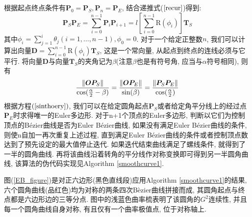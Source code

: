 \documentclass[utf8]{ctexart} %
\numberwithin{figure}{section}
\numberwithin{equation}{section}
\begin{document}
		根据起点终点条件有$\boldsymbol{P}_0=\boldsymbol{P}_S, \boldsymbol{P}_n = \boldsymbol{P}_E$, 结合递推式($\ref{recur}$)得到:
		\begin{equation}
			\boldsymbol{P}_S\boldsymbol{P}_E = \sum_{i=0}^{n-1}\boldsymbol{P}_i\boldsymbol{P}_{i+1} = l[\sum_{i=0}^{n-1}\text{R}(\phi_i)]\boldsymbol{T}_S
		\end{equation}
		其中$\phi_i=\sum_{j=1}^i\theta_j (i = 1,\dots,n-1), \phi_0 = 0$. 对于一个给定正整数$n$, 我们可以计算出向量$\boldsymbol{D} = \sum_{i=0}^{n-1}\text{R}(\phi_i)\boldsymbol{T}_S$, 这是一个常向量, 从起点到终点的连线必须与它平行. 将向量$\boldsymbol{D}$与向量$\boldsymbol{T}_S$的夹角记为$\beta$(注意$\beta$也是有符号角, 应当与$\alpha$符号相同), 则有
		\begin{equation}\label{sinthoery}
			\frac{\Arrowvert\boldsymbol{OP}_S\Arrowvert}{\cos(\frac{\alpha}2-\beta)}=\frac{\Arrowvert\boldsymbol{OP}_E\Arrowvert}{\sin(\beta)}=\frac{\Arrowvert\boldsymbol{P}_S\boldsymbol{P}_E\Arrowvert}{\cos(\frac{\alpha}2)}
		\end{equation}
		根据方程$(\ref{sinthoery})$, 我们可以在给定圆角起点$\boldsymbol{P}_S$或者给定角平分线上的经过点$\boldsymbol{P}_E$时求得唯一的Euler多边形. 对于n+1个顶点的Euler多边形, 判断以它们为控制顶点的B\'{e}zier曲线是否为Euler B\'{e}zier曲线, 如果没有满足Euler B\'{e}zier曲线的条件, 则使n自加一再次重复上述过程, 直到满足Euler B\'{e}zier曲线的条件或者控制顶点数达到了预先设定的最大值停止迭代. 如果迭代结束曲线满足了螺线条件, 就得到了一半的圆角曲线. 再将该曲线沿着转角的平分线作对称变换即可得到另一半圆角曲线, 该算法的伪代码实现见Algorithm \ref{smoothcurve1}.\par 
		图(\ref{EB_figure})是对正六边形(黑色直线段)应用Algorithm \ref{smoothcurve1}的结果, 六个圆角曲线(品红色)均为对称的两条四次B\`ezier曲线拼接而成, 其圆角起点与终点都是六边形边的三等分点. 图中的浅蓝色曲率梳表明了该圆角的$G^2$连续性, 并且每一个圆角曲线自身对称, 有且仅有一个曲率极值点, 位于对称轴上.
		\IncMargin{1em}
\end{document}
